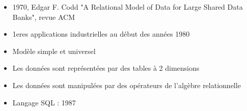 \begin{itemize}
	\item 1970, Edgar F. Codd "A Relational Model of Data for Large Shared Data Banks", revue ACM
	\item 1eres applications industrielles au début des années 1980
	\item Modèle simple et universel
	\item Les données sont représentées par des tables à 2 dimensions
	\item Les données sont manipulées par des opérateurs de l'algèbre relationnelle
	\item Langage SQL : 1987
\end{itemize}


	
